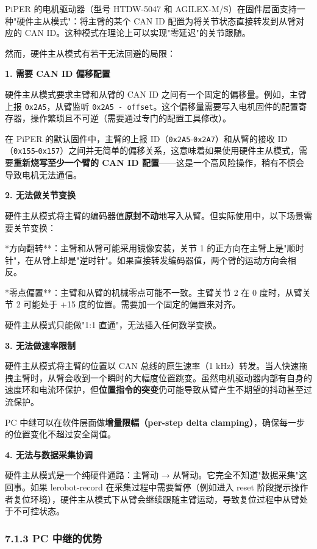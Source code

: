 \documentclass[UTF8,a4paper,11pt]{ctexart}
\begin{document}
{PiPER 的电机驱动器（型号 HTDW-5047 和 AGILEX-M/S）在固件层面支持一种"硬件主从模式"：将主臂的某个 CAN ID 配置为将关节状态直接转发到从臂对应的 CAN ID。这种模式在理论上可以实现"零延迟"的关节跟随。

然而，硬件主从模式有若干无法回避的局限：

\textbf{1. 需要 CAN ID 偏移配置}

硬件主从模式要求主臂和从臂的 CAN ID 之间有一个固定的偏移量。例如，主臂上报 \texttt{0x2A5}，从臂监听 \texttt{0x2A5 - offset}。这个偏移量需要写入电机固件的配置寄存器，操作繁琐且不可逆（需要通过专门的配置工具修改）。

在 PiPER 的默认固件中，主臂的上报 ID（\texttt{0x2A5}-\texttt{0x2A7}）和从臂的接收 ID（\texttt{0x155}-\texttt{0x157}）之间并无简单的偏移关系，这意味着如果使用硬件主从模式，需要\textbf{重新烧写至少一个臂的 CAN ID 配置}——这是一个高风险操作，稍有不慎会导致电机无法通信。

\textbf{2. 无法做关节变换}

硬件主从模式将主臂的编码器值\textbf{原封不动}地写入从臂。但实际使用中，以下场景需要关节变换：

\item **方向翻转**：主臂和从臂可能采用镜像安装，关节 1 的正方向在主臂上是"顺时针"，在从臂上却是"逆时针"。如果直接转发编码器值，两个臂的运动方向会相反。
\item **零点偏置**：主臂和从臂的机械零点可能不一致。主臂关节 2 在 0 度时，从臂关节 2 可能处于 +15 度的位置。需要加一个固定的偏置来对齐。

硬件主从模式只能做"1:1 直通"，无法插入任何数学变换。

\textbf{3. 无法做速率限制}

硬件主从模式将主臂的位置以 CAN 总线的原生速率（1 kHz）转发。当人快速拖拽主臂时，从臂会收到一个瞬时的大幅度位置跳变。虽然电机驱动器内部有自身的速度环和电流环保护，但\textbf{位置指令的突变}仍可能导致从臂产生不期望的抖动甚至过流保护。

PC 中继可以在软件层面做\textbf{增量限幅（per-step delta clamping）}，确保每一步的位置变化不超过安全阈值。

\textbf{4. 无法与数据采集协调}

硬件主从模式是一个纯硬件通路：主臂动 → 从臂动。它完全不知道"数据采集"这回事。如果 lerobot-record 在采集过程中需要暂停（例如进入 reset 阶段提示操作者复位环境），硬件主从模式下从臂会继续跟随主臂运动，导致复位过程中从臂处于不可控状态。

\subsubsection{7.1.3 PC 中继的优势}

}
\end{document}
